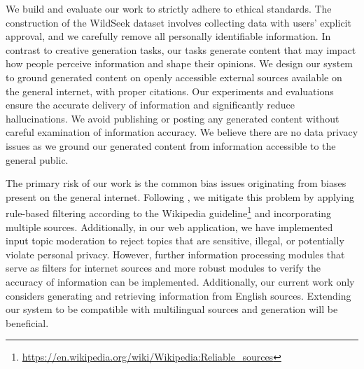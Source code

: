 
We build and evaluate our work to strictly adhere to ethical standards. The construction of the WildSeek dataset involves collecting data with users’ explicit approval, and we carefully remove all personally identifiable information. In contrast to creative generation tasks, our tasks generate content that may impact how people perceive information and shape their opinions. We design our system to ground generated content on openly accessible external sources available on the general internet, with proper citations. Our experiments and evaluations ensure the accurate delivery of information and significantly reduce hallucinations. We avoid publishing or posting any generated content without careful examination of information accuracy. We believe there are no data privacy issues as we ground our generated content from information accessible to the general public.

The primary risk of our work is the common bias issues originating from biases present on the general internet. Following \citet{shao2024assisting}, we mitigate this problem by applying rule-based filtering according to the Wikipedia guideline\footnote{\url{https://en.wikipedia.org/wiki/Wikipedia:Reliable_sources}} and incorporating multiple sources. Additionally, in our web application, we have implemented input topic moderation to reject topics that are sensitive, illegal, or potentially violate personal privacy. However, further information processing modules that serve as filters for internet sources and more robust modules to verify the accuracy of information can be implemented. Additionally, our current work only considers generating and retrieving information from English sources. Extending our system to be compatible with multilingual sources and generation will be beneficial.